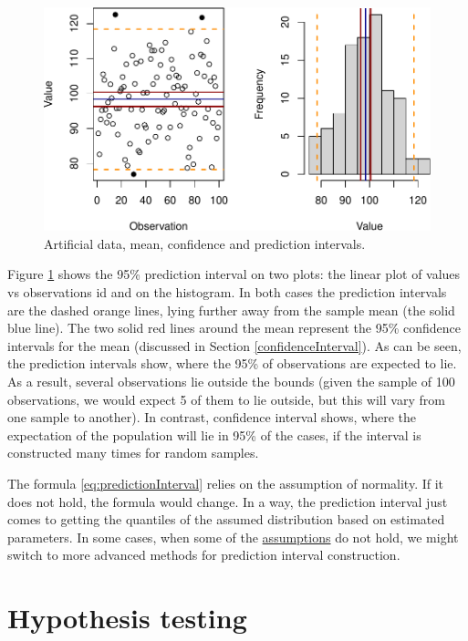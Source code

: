 \documentclass[
]{book}
\theoremstyle{definition}
\theoremstyle{definition}
\theoremstyle{definition}
\theoremstyle{definition}
\theoremstyle{remark}
\begin{document}
\begin{figure}
\centering
\includegraphics{Svetunkov---Statistics-for-Business-Analytics_files/figure-latex/predictionInterval-1.pdf}
\caption{\label{fig:predictionInterval}Artificial data, mean, confidence and prediction intervals.}
\end{figure}

Figure \ref{fig:predictionInterval} shows the 95\% prediction interval on two plots: the linear plot of values vs observations id and on the histogram. In both cases the prediction intervals are the dashed orange lines, lying further away from the sample mean (the solid blue line). The two solid red lines around the mean represent the 95\% confidence intervals for the mean (discussed in Section \ref{confidenceInterval}). As can be seen, the prediction intervals show, where the 95\% of observations are expected to lie. As a result, several observations lie outside the bounds (given the sample of 100 observations, we would expect 5 of them to lie outside, but this will vary from one sample to another). In contrast, confidence interval shows, where the expectation of the population will lie in 95\% of the cases, if the interval is constructed many times for random samples.

The formula \eqref{eq:predictionInterval} relies on the assumption of normality. If it does not hold, the formula would change. In a way, the prediction interval just comes to getting the quantiles of the assumed distribution based on estimated parameters. In some cases, when some of the \protect\hyperlink{assumptions}{assumptions} do not hold, we might switch to more advanced methods for prediction interval construction.

\hypertarget{hypothesisTesting}{%
\chapter{Hypothesis testing}\label{hypothesisTesting}}
\end{document}
